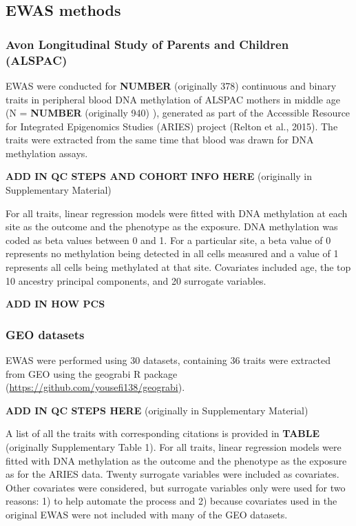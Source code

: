 \documentclass[11pt,twoside]{bristolthesis}
\begin{document}
\hypertarget{ewas-methods}{%
\subsection{EWAS methods}\label{ewas-methods}}

\hypertarget{avon-longitudinal-study-of-parents-and-children-alspac}{%
\subsubsection{Avon Longitudinal Study of Parents and Children (ALSPAC)}\label{avon-longitudinal-study-of-parents-and-children-alspac}}

EWAS were conducted for \textbf{NUMBER} (originally 378) continuous and binary traits in peripheral blood DNA methylation of ALSPAC mothers in middle age (N = \textbf{NUMBER} (originally 940) ), generated as part of the Accessible Resource for Integrated Epigenomics Studies (ARIES) project (Relton et al., 2015). The traits were extracted from the same time that blood was drawn for DNA methylation assays.

\textbf{ADD IN QC STEPS AND COHORT INFO HERE} (originally in Supplementary Material)

For all traits, linear regression models were fitted with DNA methylation at each site as the outcome and the phenotype as the exposure. DNA methylation was coded as beta values between 0 and 1. For a particular site, a beta value of 0 represents no methylation being detected in all cells measured and a value of 1 represents all cells being methylated at that site. Covariates included age, the top 10 ancestry principal components, and 20 surrogate variables.

\textbf{ADD IN HOW PCS}

\hypertarget{geo-datasets}{%
\subsubsection{GEO datasets}\label{geo-datasets}}

EWAS were performed using 30 datasets, containing 36 traits were extracted from GEO using the geograbi R package (\url{https://github.com/yousefi138/geograbi}).

\textbf{ADD IN QC STEPS HERE} (originally in Supplementary Material)

A list of all the traits with corresponding citations is provided in \textbf{TABLE} (originally Supplementary Table 1).
For all traits, linear regression models were fitted with DNA methylation as the outcome and the phenotype as the exposure as for the ARIES data. Twenty surrogate variables were included as covariates. Other covariates were considered, but surrogate variables only were used for two reasons: 1) to help automate the process and 2) because covariates used in the original EWAS were not included with many of the GEO datasets.
\end{document}
